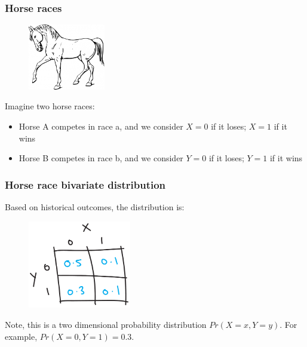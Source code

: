 \documentclass{beamer}
\begin{document}
	\begin{frame}
		\frametitle{Horse races}
		
		\begin{figure}[ht]
			\centerline{\includegraphics[width=0.3\textwidth]{./figures/horse.jpeg}}
		\end{figure}
		
		Imagine two horse races:
		
		\begin{itemize}
			\item Horse A competes in race a, and we consider $X=0$ if it loses; $X=1$ if it wins
			\item Horse B competes in race b, and we consider $Y=0$ if it loses; $Y=1$ if it wins
		\end{itemize}
		
	\end{frame}
	
	\begin{frame}
		\frametitle{Horse race bivariate distribution}
		
		Based on historical outcomes, the distribution is:
		
		\begin{figure}[ht]
			\centerline{\includegraphics[width=0.4\textwidth]{./figures/horse_race_base.pdf}}
		\end{figure}
		
		Note, this is a two dimensional probability distribution $Pr(X=x, Y=y)$. For example, $Pr(X=0, Y=1)=0.3$.
		
	\end{frame}
	
\end{document}
